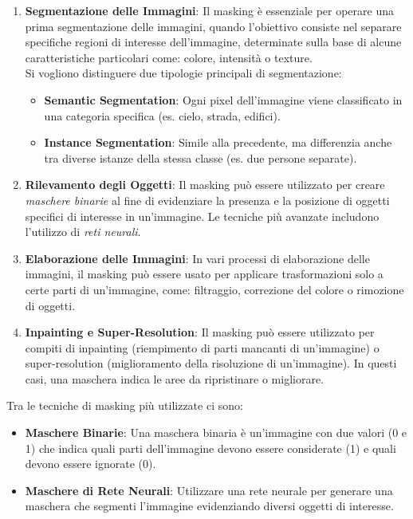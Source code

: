 \documentclass[12pt,a4paper,openright,twoside]{book}
\begin{document}
\begin{enumerate}
\item \textbf{Segmentazione delle Immagini}:
Il masking è essenziale per operare una prima segmentazione delle immagini, quando l'obiettivo consiste nel separare specifiche regioni di interesse dell'immagine, determinate sulla base di alcune caratteristiche particolari come: colore, intensità o texture. \\
Si vogliono distinguere due tipologie principali di segmentazione:
\begin{itemize}
\item \textbf{Semantic Segmentation}: Ogni pixel dell'immagine viene classificato in una categoria specifica (es. cielo, strada, edifici).
\item \textbf{Instance Segmentation}: Simile alla precedente, ma differenzia anche tra diverse istanze della stessa classe (es. due persone separate).
\end{itemize}

\item \textbf{Rilevamento degli Oggetti}:
Il masking può essere utilizzato per creare {\itshape maschere binarie} al fine di evidenziare la presenza e la posizione di oggetti specifici di interesse in un'immagine. Le tecniche più avanzate includono l'utilizzo di {\itshape reti neurali}.

\item \textbf{Elaborazione delle Immagini}:
In vari processi di elaborazione delle immagini, il masking può essere usato per applicare trasformazioni solo a certe parti di un'immagine, come: filtraggio, correzione del colore o rimozione di oggetti.

\item \textbf{Inpainting e Super-Resolution}:
Il masking può essere utilizzato per compiti di inpainting (riempimento di parti mancanti di un'immagine) o super-resolution (miglioramento della risoluzione di un'immagine). In questi casi, una maschera indica le aree da ripristinare o migliorare.
\end{enumerate}

Tra le tecniche di masking più utilizzate ci sono:
\begin{itemize}
\item \textbf{Maschere Binarie}:
Una maschera binaria è un'immagine con due valori (0 e 1) che indica quali parti dell'immagine devono essere considerate (1) e quali devono essere ignorate (0).
\item \textbf{Maschere di Rete Neurali}:
Utilizzare una rete neurale per generare una maschera che segmenti l'immagine evidenziando diversi oggetti di interesse.
\end{itemize}
\end{document}
